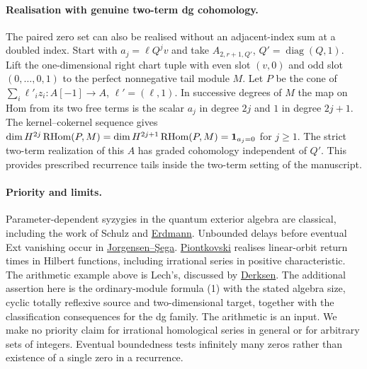\documentclass[11pt]{article}
\begin{document}
\paragraph{Realisation with genuine two-term dg cohomology.}
The paired zero set can also be realised without an adjacent-index
sum at a doubled index. Start with $a_j=\ell Q^jv$ and take
$A_{2,r+1,Q'}$, $Q'=\operatorname{diag}(Q,1)$. Lift the one-dimensional
right chart tuple with even slot $(v,0)$ and odd slot $(0,\ldots,0,1)$
to the perfect nonnegative tail module $M$. Let $P$ be the cone of
$\sum_i\ell'_i z_i:A[-1]\to A$, $\ell'=(\ell,1)$.
In successive degrees of $M$ the map on Hom from its two free terms
is the scalar $a_j$ in degree $2j$ and $1$ in degree $2j+1$.
The kernel--cokernel sequence gives
$\dim H^{2j}\operatorname{RHom}(P,M)=\dim H^{2j+1}\operatorname{RHom}(P,M)=\mathbf1_{a_j=0}$
for $j\ge1$. The strict two-term realization of this $A$ has graded
cohomology independent of $Q'$. This provides prescribed recurrence
tails inside the two-term setting of the manuscript.

\paragraph{Priority and limits.}
Parameter-dependent syzygies in the quantum exterior algebra are
classical, including the work of Schulz and
\href{https://arxiv.org/abs/1511.01418}{Erdmann}. Unbounded delays
before eventual Ext vanishing occur in
\href{https://arxiv.org/abs/math/0306001}{Jorgensen--\c Sega}.
\href{https://arxiv.org/abs/1706.06470}{Piontkovski} realises
linear-orbit return times in Hilbert functions, including irrational
series in positive characteristic. The arithmetic example above is
Lech's, discussed by \href{https://arxiv.org/abs/math/0510583}{Derksen}.
The additional assertion here is the ordinary-module formula (1)
with the stated algebra size, cyclic totally reflexive source and
two-dimensional target, together with the classification consequences
for the dg family. The arithmetic is an input. We make no priority
claim for irrational homological series in general or for arbitrary
sets of integers. Eventual boundedness tests infinitely many zeros
rather than existence of a single zero in a recurrence.
\end{document}
